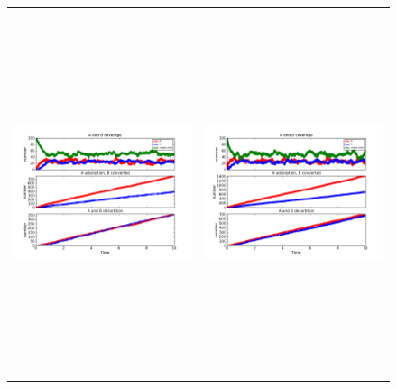 \documentclass[11pt]{article}
\begin{document}
\setlength{\unitlength}{1in}
\begin{figure}[h!]
\begin{tabular}{cc}
\includegraphics[width=3.5in, height=4.2in]{./coadsorb_irreversible/AtoBirreversible10x10_101_allsameksmall_A5_EA1E3_3.png} &
\includegraphics[width=3.5in, height=4.2in]{./coadsorb_irreversible/AtoBirreversible10x10_201_allsameksmall_A5_EA1E3_3.png} \\

\end{tabular}
\end{figure}
\end{document}
